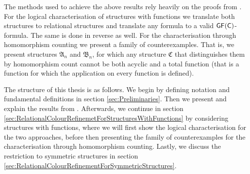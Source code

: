 The methods used to achieve the above results rely heavily on the proofs from \cite{scheidt2025ColorRefinement}.
For the logical characterisation of structures with functions we translate both structures to relational structures and translate any formula to a valid $\mathsf{GF}(\mathsf{C})$-formula.
The same is done in reverse as well.
For the characterisation through homomorphism counting we present a family of counterexamples.
That is, we present structures $\mathfrak A_n$ and $\mathfrak B_n$, for which any structure $\mathfrak C$ that distinguishes them by homomorphism count cannot be both acyclic and a total function (that is a function for which the application on every function is defined).

The structure of this thesis is as follows.
We begin by defining notation and fundamental definitions in section \ref{sec:Preliminaries}.
Then we present and explain the results from \cite{scheidt2025ColorRefinement}.
Afterwards, we continue in section \ref{sec:RelationalColourRefinemetForStructuresWithFunctions} by considering structures with functions, where we will first show the logical characterisation for the two approaches, before then presenting the family of counterexamples for the characterisation through homomorphism counting.
Lastly, we discuss the restriction to symmetric structures in section \ref{sec:RelationalColourRefinementForSymmetricStructures}.


